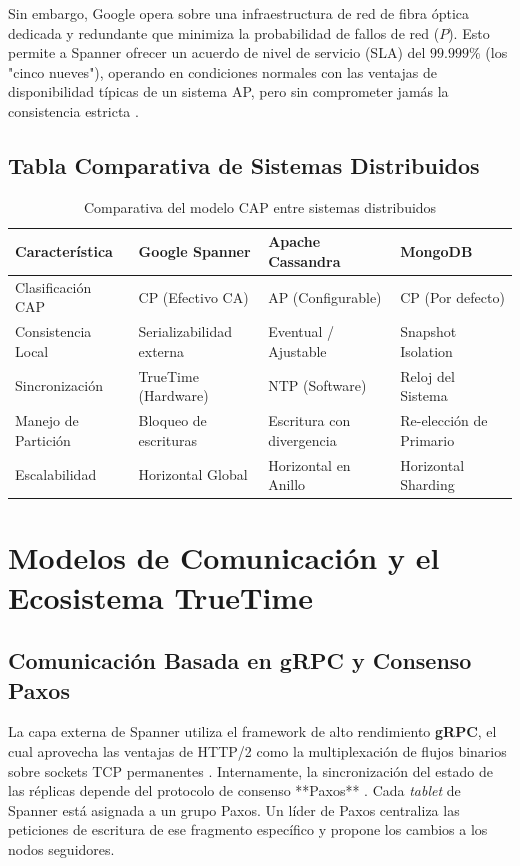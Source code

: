 \documentclass[11pt,a4paper]{article}
\begin{document}
Sin embargo, Google opera sobre una infraestructura de red de fibra óptica dedicada y redundante que minimiza la probabilidad de fallos de red ($P$). Esto permite a Spanner ofrecer un acuerdo de nivel de servicio (SLA) del $99.999\%$ (los "cinco nueves"), operando en condiciones normales con las ventajas de disponibilidad típicas de un sistema AP, pero sin comprometer jamás la consistencia estricta \cite{brewer2012}.

\subsection{Tabla Comparativa de Sistemas Distribuidos}
\begin{table}[h]
\centering
\begin{tabular}{@{}llll@{}}
\toprule
\textbf{Característica} & \textbf{Google Spanner} & \textbf{Apache Cassandra} & \textbf{MongoDB} \\ \midrule
Clasificación CAP & CP (Efectivo CA) & AP (Configurable) & CP (Por defecto) \\
Consistencia Local & Serializabilidad externa & Eventual / Ajustable & Snapshot Isolation \\
Sincronización & TrueTime (Hardware) & NTP (Software) & Reloj del Sistema \\
Manejo de Partición & Bloqueo de escrituras & Escritura con divergencia & Re-elección de Primario \\
Escalabilidad & Horizontal Global & Horizontal en Anillo & Horizontal Sharding \\ \bottomrule
\end{tabular}
\caption{Comparativa del modelo CAP entre sistemas distribuidos}
\label{tab:cap_comparativa}
\end{table}

\section{Modelos de Comunicación y el Ecosistema TrueTime}
\subsection{Comunicación Basada en gRPC y Consenso Paxos}
La capa externa de Spanner utiliza el framework de alto rendimiento \textbf{gRPC}, el cual aprovecha las ventajas de HTTP/2 como la multiplexación de flujos binarios sobre sockets TCP permanentes \cite{googledocs2024}. Internamente, la sincronización del estado de las réplicas depende del protocolo de consenso **Paxos** \cite{lamport1998}. Cada \textit{tablet} de Spanner está asignada a un grupo Paxos. Un líder de Paxos centraliza las peticiones de escritura de ese fragmento específico y propone los cambios a los nodos seguidores.
\end{document}
